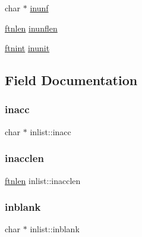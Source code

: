 \begin{DoxyCompactItemize}
\item 
char $\ast$ \hyperlink{structinlist_a5cb5e045deaa5422f8c3107401fca1ba}{inunf}
\item 
\hyperlink{dependencies_2third-party_2clapack_23_82_81_2_f2_c_l_i_b_s_2libf2c_2f2c_8h_a2ad57b5f7f73e0131623aa6dbff6d3f3}{ftnlen} \hyperlink{structinlist_a4a5e555086d129a2b8edc7d2ff3b3725}{inunflen}
\item 
\hyperlink{dependencies_2third-party_2clapack_23_82_81_2_f2_c_l_i_b_s_2libf2c_2f2c_8h_a9d70cdb573fb2bf020e1f6dba85fb1cc}{ftnint} \hyperlink{structinlist_a69244da0365f1012d4ed89d569c7e687}{inunit}
\end{DoxyCompactItemize}


\subsection{Field Documentation}
\mbox{\label{structinlist_a90629aebbca70e409e407832c708d52f}} 
\subsubsection{\texorpdfstring{inacc}{inacc}}
{\footnotesize\ttfamily char $\ast$ inlist\+::inacc}

\mbox{\label{structinlist_a78dde025010d1d60468984985467e5a5}} 
\subsubsection{\texorpdfstring{inacclen}{inacclen}}
{\footnotesize\ttfamily \hyperlink{dependencies_2third-party_2clapack_23_82_81_2_f2_c_l_i_b_s_2libf2c_2f2c_8h_a2ad57b5f7f73e0131623aa6dbff6d3f3}{ftnlen} inlist\+::inacclen}

\mbox{\label{structinlist_a1482d75fb9eb997602cb8ab7f5935155}} 
\subsubsection{\texorpdfstring{inblank}{inblank}}
{\footnotesize\ttfamily char $\ast$ inlist\+::inblank}

\mbox{\label{structinlist_a2aec2496017c66c3ba0d96adcb2b37a0}} 
